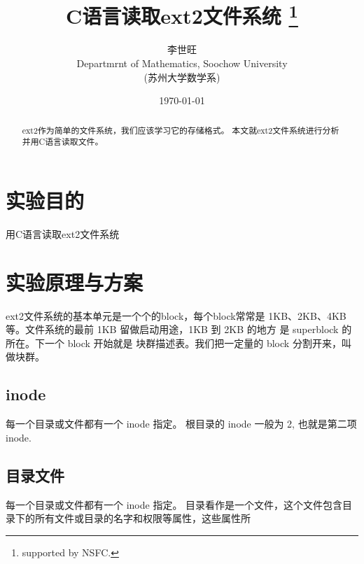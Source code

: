\documentclass[UTF8,a4paper,12pt]{ctexart}
\title
{
C语言读取ext2文件系统
\thanks{supported by NSFC.}
\footnotetext{\textit{Keyword:}特征值}
}
\author
{李世旺\\[5pt] Departmrnt of Mathematics, Soochow University\\(苏州大学数学系)}
\date{\today}
\begin{document}
\maketitle
\begin{abstract}
ext2作为简单的文件系统，我们应该学习它的存储格式。
本文就ext2文件系统进行分析并用C语言读取文件。
\end{abstract}
\newpage

\tableofcontents
\newpage
\section{实验目的}
用C语言读取ext2文件系统
\section{实验原理与方案}
ext2文件系统的基本单元是一个个的block，每个block常常是 1KB、2KB、4KB等。文件系统的最前 1KB 留做启动用途，1KB 到 2KB 的地方
是 superblock 的所在。下一个 block 开始就是 块群描述表。我们把一定量的 block 分割开来，叫做块群。
\subsection{inode}
每一个目录或文件都有一个 inode 指定。
根目录的 inode 一般为 2, 也就是第二项 inode.
\subsection{目录文件}
每一个目录或文件都有一个 inode 指定。
目录看作是一个文件，这个文件包含目录下的所有文件或目录的名字和权限等属性，这些属性所
\end{document}
